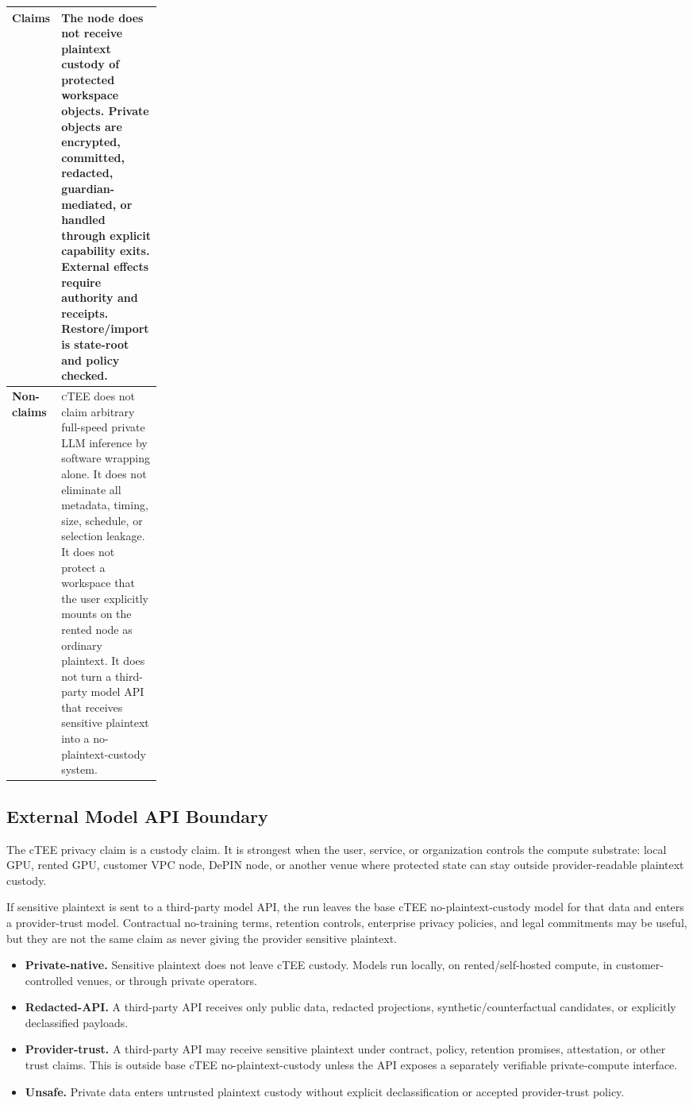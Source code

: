 \documentclass[11pt]{article}
\newcommand{\ctee}{\textnormal{\textsc{cTEE}}}
\begin{document}
\begin{tabularx}{\linewidth}{p{0.22\linewidth}X}
\toprule
\textbf{Claims} &
The node does not receive plaintext custody of protected workspace objects.
Private objects are encrypted, committed, redacted, guardian-mediated, or
handled through explicit capability exits. External effects require authority
and receipts. Restore/import is state-root and policy checked. \\
\midrule
\textbf{Non-claims} &
\ctee{} does not claim arbitrary full-speed private LLM inference by software
wrapping alone. It does not eliminate all metadata, timing, size, schedule, or
selection leakage. It does not protect a workspace that the user explicitly
mounts on the rented node as ordinary plaintext. It does not turn a
third-party model API that receives sensitive plaintext into a
no-plaintext-custody system. \\
\bottomrule
\end{tabularx}

\subsection{External Model API Boundary}

The cTEE privacy claim is a custody claim. It is strongest when the user,
service, or organization controls the compute substrate: local GPU, rented GPU,
customer VPC node, DePIN node, or another venue where protected state can stay
outside provider-readable plaintext custody.

If sensitive plaintext is sent to a third-party model API, the run leaves the
base cTEE no-plaintext-custody model for that data and enters a provider-trust
model. Contractual no-training terms, retention controls, enterprise privacy
policies, and legal commitments may be useful, but they are not the same claim
as never giving the provider sensitive plaintext.

\begin{itemize}[leftmargin=1.5em]
\item \textbf{Private-native.} Sensitive plaintext does not leave cTEE custody.
Models run locally, on rented/self-hosted compute, in customer-controlled
venues, or through private operators.
\item \textbf{Redacted-API.} A third-party API receives only public data,
redacted projections, synthetic/counterfactual candidates, or explicitly
declassified payloads.
\item \textbf{Provider-trust.} A third-party API may receive sensitive plaintext
under contract, policy, retention promises, attestation, or other trust claims.
This is outside base cTEE no-plaintext-custody unless the API exposes a
separately verifiable private-compute interface.
\item \textbf{Unsafe.} Private data enters untrusted plaintext custody without
explicit declassification or accepted provider-trust policy.
\end{itemize}
\end{document}
